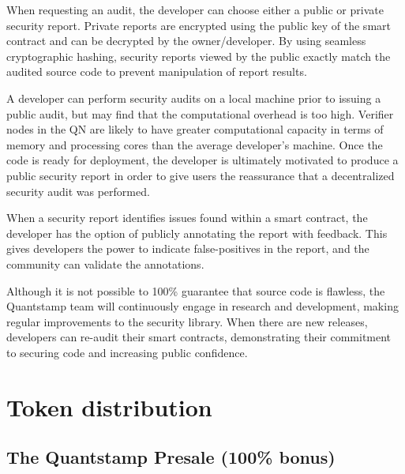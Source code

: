 \documentclass[final,smallcondensed]{llncs}
\begin{document}
When requesting an audit, the developer can choose either a public or private security report. Private reports are encrypted using the public key of the smart contract and can be decrypted by the owner/developer. By using seamless cryptographic hashing, security reports viewed by the public exactly match the audited source code to prevent manipulation of report results.

A developer can perform security audits on a local machine prior to issuing a public audit, but may find that the computational overhead is too high. Verifier nodes in the QN are likely to have greater computational capacity in terms of memory and processing cores than the average developer's machine. Once the code is ready for deployment, the developer is ultimately motivated to produce a public security report in order to give users the reassurance that a decentralized security audit was performed.

When a security report identifies issues found within a smart contract, the developer has the option of publicly annotating the report with feedback. This gives developers the power to indicate false-positives in the report, and the community can validate the annotations.

Although it is not possible to 100\% guarantee that source code is flawless, the Quantstamp team will continuously engage in research and development, making regular improvements to the security library. When there are new releases, developers can re-audit their smart contracts, demonstrating their commitment to securing code and increasing public confidence.


\section{Token distribution}

\subsection{The Quantstamp Presale (100\% bonus)}
\end{document}
